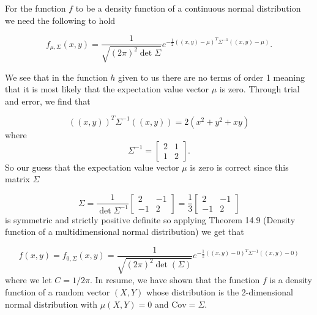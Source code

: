 
For the function $ f$ to be a density function of a continuous normal distribution we need the
following to hold

\[
    f_{\mu, \Sigma} (x,y) = \frac{1}{\sqrt{(2\pi)^2 \det \Sigma}} e^{- \frac{1}{2} ((x,y) - \mu)^{T}
    \Sigma^{-1} ((x,y)-\mu)} 
.\] 

We see that in the function $ h$  given to us there are no terms of order 1 meaning that it is most likely
that the expectation value vector $ \mu$  is zero. Through trial and error, we find that 

\[
    ((x,y))^{T} \Sigma^{-1} ((x,y)) = 2(x^2 + y^2 + xy)
\] 
where 
\[
    \Sigma^{-1} = \begin{bmatrix}
	2 & 1\\
	1 & 2
    \end{bmatrix}
.\] 
So our guess that the expectation value vector $ \mu $  is zero is correct since this matrix $ \Sigma$ 

\[
    \Sigma = \frac{1}{\det \Sigma^{-1} } \begin{bmatrix}
	2 & -1 \\
	-1 & 2
    \end{bmatrix} = \frac{1}{3} \begin{bmatrix}
	2 & -1 \\
	-1 & 2
    \end{bmatrix}
\] 
is symmetric and strictly positive definite so applying Theorem 14.9 (Density function of a
multidimensional normal distribution) we get that 

\[
    f(x,y) = f_{0, \Sigma} (x,y) = \frac{1}{\sqrt{(2\pi)^{2} \det(\Sigma)}} e^{- \frac{1}{2} ((x,y)-0)^{T} \Sigma^{-1}
    ((x,y)-0)} 
\] 
where we let $ C = 1/2\pi$.
In resume, we have shown that the function $ f$ is a density function of a random vector 
$ (X,Y)$ whose distribution is the 2-dimensional normal distribution with $ \mu(X,Y) = 0$ and $ \mathrm{Cov} = \Sigma$.
